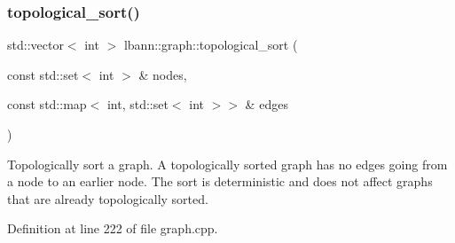 \subsubsection{\texorpdfstring{topological\+\_\+sort()}{topological\_sort()}}
{\footnotesize\ttfamily std\+::vector$<$ int $>$ lbann\+::graph\+::topological\+\_\+sort (\begin{DoxyParamCaption}\item[{const std\+::set$<$ int $>$ \&}]{nodes,  }\item[{const std\+::map$<$ int, std\+::set$<$ int $>$$>$ \&}]{edges }\end{DoxyParamCaption})}

Topologically sort a graph. A topologically sorted graph has no edges going from a node to an earlier node. The sort is deterministic and does not affect graphs that are already topologically sorted. 

Definition at line 222 of file graph.\+cpp.



